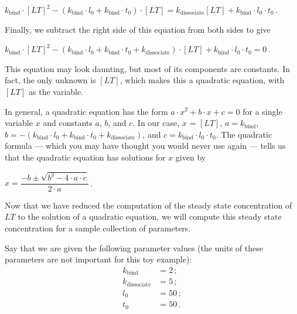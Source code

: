 \begin{center}
$k_\text{bind} \cdot [LT]^2 - (k_\text{bind} \cdot l_0 + k_\text{bind} \cdot t_0) \cdot [LT]  = k_\text{dissociate} [LT] + k_\text{bind} \cdot l_0 \cdot t_0$\,.
\end{center}

\noindent Finally, we subtract the right side of this equation from both sides to give

\begin{center}
$k_\text{bind} \cdot [LT]^2 - (k_\text{bind} \cdot l_0 + k_\text{bind} \cdot t_0 + k_\text{dissociate}) \cdot [LT] + k_\text{bind} \cdot l_0 \cdot t_0 = 0$\,.
\end{center}

\noindent This equation may look daunting, but most of its components are constants. In fact, the only unknown is $[LT]$, which makes this a quadratic equation, with $[LT]$ as the variable.

In general, a quadratic equation has the form $a \cdot x^2 + b \cdot x + c = 0$ for a single variable $x$ and constants $a$, $b$, and $c$. In our case, $x$ = $[LT]$, $a = k_\text{bind}$, $b = - (k_\text{bind} \cdot l_0 + k_\text{bind} \cdot t_0 + k_\text{dissociate})$, and $c = k_\text{bind} \cdot l_0 \cdot t_0$. The quadratic formula --- which you may have thought you would never use again --- tells us that the quadratic equation has solutions for $x$ given by

\begin{center}
$x = \dfrac{-b \pm \sqrt{b^2 - 4 \cdot a \cdot c}}{2 \cdot a}$\,.
\end{center}

\fudgespace

\begin{qbox}\end{qbox}

Now that we have reduced the computation of the steady state concentration of $LT$ to the solution of a quadratic equation, we will compute this steady state concentration for a sample collection of parameters.

Say that we are given the following parameter values (the units of these parameters are not important for this toy example):
\begin{align*}
k_\text{bind} & = 2\,;\\
k_\text{dissociate} & = 5\,;\\
l_0 & = 50\,;\\
t_0 & = 50\,.
\end{align*}

